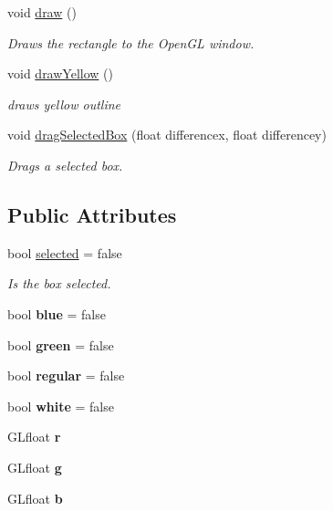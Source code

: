 \begin{DoxyCompactItemize}
\mbox{\label{class_box_a17f768f00ee22cb18146a4150f9ae396}} 
void \hyperlink{class_box_a17f768f00ee22cb18146a4150f9ae396}{draw} ()
\begin{DoxyCompactList}\small\item\em Draws the rectangle to the Open\+GL window. \end{DoxyCompactList}\item 
void \hyperlink{class_box_adac20cad0ebf27da08d6b251c848d42a}{draw\+Yellow} ()
\begin{DoxyCompactList}\small\item\em draws yellow outline \end{DoxyCompactList}\item 
void \hyperlink{class_box_a2c0e2d7f2862ccf900cef89db6e51679}{drag\+Selected\+Box} (float differencex, float differencey)
\begin{DoxyCompactList}\small\item\em Drags a selected box. \end{DoxyCompactList}\end{DoxyCompactItemize}
\subsection*{Public Attributes}
\begin{DoxyCompactItemize}
\item 
\mbox{\label{class_box_aa61340138a8eaeb36395293c54aec4a1}} 
bool \hyperlink{class_box_aa61340138a8eaeb36395293c54aec4a1}{selected} = false
\begin{DoxyCompactList}\small\item\em Is the box selected. \end{DoxyCompactList}\item 
\mbox{\label{class_box_adf8471c9458d66bf70133ea82fc3e573}} 
bool {\bfseries blue} = false
\item 
\mbox{\label{class_box_a56e505754cda98f6d9dce9ec1b9e1784}} 
bool {\bfseries green} = false
\item 
\mbox{\label{class_box_abe969fa54b988288fea44bd1d4b18df5}} 
bool {\bfseries regular} = false
\item 
\mbox{\label{class_box_a3393c92d8028e14f3e28d0425ec44d2d}} 
bool {\bfseries white} = false
\item 
\mbox{\label{class_box_a0d197db18c51795fea6e4b5e2faca105}} 
G\+Lfloat {\bfseries r}
\item 
\mbox{\label{class_box_ad940e36d5f64c04c9240825e75343754}} 
G\+Lfloat {\bfseries g}
\item 
\mbox{\label{class_box_ae098dc1025a4c65a3cd1fe6871fdd025}} 
G\+Lfloat {\bfseries b}
\end{DoxyCompactItemize}


